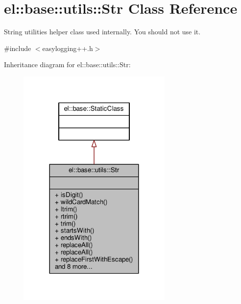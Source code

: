\hypertarget{classel_1_1base_1_1utils_1_1Str}{}\section{el\+:\+:base\+:\+:utils\+:\+:Str Class Reference}
\label{classel_1_1base_1_1utils_1_1Str}


String utilities helper class used internally. You should not use it.  




{\ttfamily \#include $<$easylogging++.\+h$>$}



Inheritance diagram for el\+:\+:base\+:\+:utils\+:\+:Str\+:
\nopagebreak
\begin{figure}[H]
\begin{center}
\leavevmode
\includegraphics[width=216pt]{d4/d0f/classel_1_1base_1_1utils_1_1Str__inherit__graph}
\end{center}
\end{figure}


